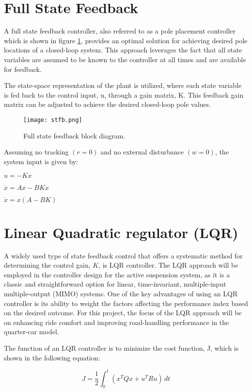 \section{Full State Feedback}
A full state feedback controller, also referred to as a pole placement controller which is shown in figure \ref{fig:stfb}, provides an optimal solution for achieving desired pole locations of a closed-loop system. This approach leverages the fact that all state variables are assumed to be known to the controller at all times and are available for feedback.

The state-space representation of the plant is utilized, where each state variable is fed back to the control input, u, through a gain matrix, K. This feedback gain matrix can be adjusted to achieve the desired closed-loop pole values.

\begin{figure}[H]
	\centering
	\texttt{[image: stfb.png]}
	\caption{Full state feedback block diagram. \cite{controltutorials}
	}
	\label{fig:stfb}
\end{figure}

Assuming no tracking $(r=0)$ and no external disturbance $(w=0)$, the system input is given by:

$u = -Kx$

$\dot{x} = Ax - BKx$

$\dot{x} = x(A - BK)$

\section{Linear Quadratic regulator (LQR)}
A widely used type of state feedback control that offers a systematic method for determining the control gain, $K$, is LQR controller. The LQR approach will be employed in the controller design for the active suspension system, as it is a classic and straightforward option for linear, time-invariant, multiple-input multiple-output (MIMO) systems. One of the key advantages of using an LQR controller is its ability to weight the factors affecting the performance index based on the desired outcome. For this project, the focus of the LQR approach will be on enhancing ride comfort and improving road-handling performance in the quarter-car model.

\newpage
The function of an LQR controller is to minimize the cost function, J, which is shown in the following equation:

\[
J = \frac{1}{2} \int_{0}^{t} (x^{T}Qx + u^{T}Ru) \, dt 
\]

